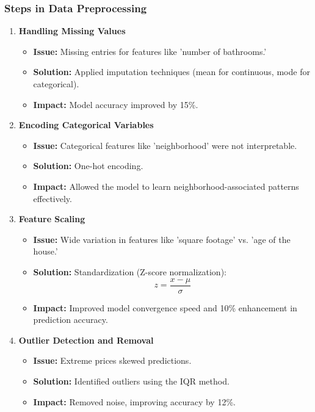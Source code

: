 \documentclass[aspectratio=169]{beamer}
\begin{document}
\begin{frame}[fragile]
    \frametitle{Steps in Data Preprocessing}
    \begin{enumerate}
        \item \textbf{Handling Missing Values}
            \begin{itemize}
                \item \textbf{Issue:} Missing entries for features like 'number of bathrooms.'
                \item \textbf{Solution:} Applied imputation techniques (mean for continuous, mode for categorical).
                \item \textbf{Impact:} Model accuracy improved by 15\%.
            \end{itemize}
        
        \item \textbf{Encoding Categorical Variables}
            \begin{itemize}
                \item \textbf{Issue:} Categorical features like 'neighborhood' were not interpretable.
                \item \textbf{Solution:} One-hot encoding.
                \item \textbf{Impact:} Allowed the model to learn neighborhood-associated patterns effectively.
            \end{itemize}

        \item \textbf{Feature Scaling}
            \begin{itemize}
                \item \textbf{Issue:} Wide variation in features like 'square footage' vs. 'age of the house.'
                \item \textbf{Solution:} Standardization (Z-score normalization):
                \begin{equation}
                z = \frac{x - \mu}{\sigma}
                \end{equation}
                
                \item \textbf{Impact:} Improved model convergence speed and 10\% enhancement in prediction accuracy.
            \end{itemize}

        \item \textbf{Outlier Detection and Removal}
            \begin{itemize}
                \item \textbf{Issue:} Extreme prices skewed predictions.
                \item \textbf{Solution:} Identified outliers using the IQR method.
                \item \textbf{Impact:} Removed noise, improving accuracy by 12\%.
            \end{itemize}
    \end{enumerate}
\end{frame}
\end{document}
